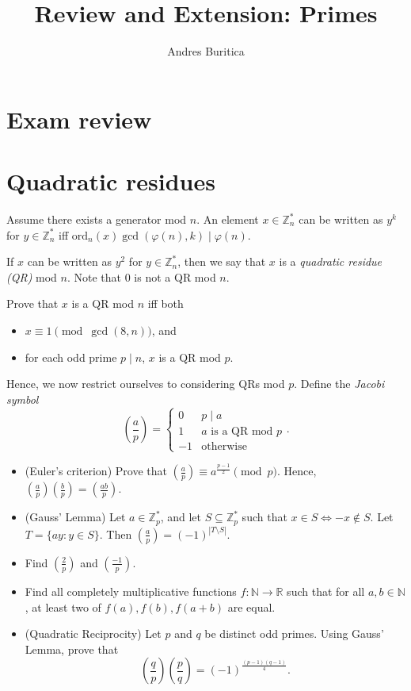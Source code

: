 \documentclass{article}
\title{Review and Extension: Primes}
\author{Andres Buritica}
\date{}
\newcommand\Zz{\mathbb{Z}}
\newcommand\ord{\mathrm{ord}}
\begin{document}
\maketitle
\section{Exam review}
\newpage
\section{Quadratic residues}
Assume there exists a generator mod $n$.
An element $x\in\Zz_n^*$ can be written as $y^k$ for $y\in\Zz_n^*$ iff
$\ord_n(x)\gcd(\varphi(n),k)\mid \varphi(n)$.

If $x$ can be written as $y^2$ for $y\in\Zz_n^*$, then we say that $x$ is a
\emph{quadratic residue (QR)} mod $n$. Note that $0$ is not a QR mod $n$.

Prove that $x$ is a QR mod $n$ iff both
\begin{itemize}
  \item $x\equiv 1\pmod{\gcd(8,n)}$, and
  \item for each odd prime $p\mid n$, $x$ is a QR mod $p$.
\end{itemize}

Hence, we now restrict ourselves to considering QRs mod $p$.
Define the \emph{Jacobi symbol}
\[\left(\frac ap\right)=\begin{cases} 0&p\mid a \\ 1&a\text{ is a QR mod }p \\
-1&\text{otherwise}\end{cases}.\]

\begin{itemize}
  \item (Euler's criterion) Prove that
    $\left(\frac ap\right)\equiv a^{\frac{p-1}2}\pmod p$.
    Hence, $\left(\frac ap\right)\left(\frac
    bp\right)=\left(\frac{ab}p\right)$.
  \item (Gauss' Lemma) Let $a\in\Zz_p^*$, and let $S\subseteq\Zz_p^*$ such that $x\in S\iff
    -x\not\in S$. Let $T=\{ay:y\in S\}$. Then
    $\left(\frac ap\right)=(-1)^{|T\setminus S|}$.
  \item Find $\left(\frac 2p\right)$ and $\left(\frac{-1}p\right)$.
  \item Find all completely multiplicative functions $f:\mathbb N\to\mathbb R$
    such that for all $a,b\in\mathbb N$, at least two of $f(a),f(b),f(a+b)$ are
    equal.
  \item (Quadratic Reciprocity) Let $p$ and $q$ be distinct odd primes. Using
    Gauss' Lemma, prove that
  \[\left(\frac qp\right)\left(\frac pq\right)=(-1)^{\frac{(p-1)(q-1)}4}.\]
\end{itemize}
\end{document}
